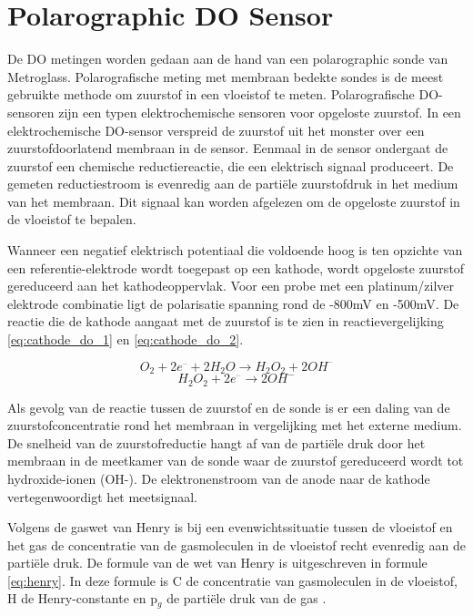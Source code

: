 \section{Polarographic DO Sensor}
De DO metingen worden gedaan aan de hand van een polarographic sonde van Metroglass. Polarografische meting met membraan bedekte sondes is de meest gebruikte methode om zuurstof in een vloeistof te meten. Polarografische DO-sensoren zijn een typen elektrochemische sensoren voor opgeloste zuurstof. In een elektrochemische DO-sensor verspreid de zuurstof uit het monster over een zuurstofdoorlatend membraan in de sensor. Eenmaal in de sensor ondergaat de zuurstof een chemische reductiereactie, die een elektrisch signaal produceert. De gemeten reductiestroom is evenredig aan de partiële zuurstofdruk in het medium van het membraan. Dit signaal kan worden afgelezen om de opgeloste zuurstof in de vloeistof te bepalen.

Wanneer een negatief elektrisch potentiaal die voldoende hoog is ten opzichte van een referentie-elektrode wordt toegepast op een kathode, wordt opgeloste zuurstof gereduceerd aan het kathodeoppervlak\cite{hamilton_do}. Voor een probe met een platinum/zilver elektrode combinatie ligt de polarisatie spanning rond de -800mV en -500mV. De reactie die de kathode aangaat met de zuurstof is te zien in reactievergelijking \ref{eq:cathode_do_1} en \ref{eq:cathode_do_2}\cite{linek_covered_probes}.

\begin{equation}\label{eq:cathode_do_1}
	O_{2} + 2e^{–} + 2H_{2}O \rightarrow H_{2}O_{2} + 2OH^{–}
\end{equation}
\begin{equation}\label{eq:cathode_do_2}
	H_{2}O_{2} + 2e^{–} \rightarrow  2OH^{-}
\end{equation}

Als gevolg van de reactie tussen de zuurstof en de sonde is er een daling van de zuurstofconcentratie rond het membraan in vergelijking met het externe medium. De snelheid van de zuurstofreductie hangt af van de partiële druk door het membraan in de meetkamer van de sonde waar de zuurstof gereduceerd wordt tot
hydroxide-ionen (OH-)\cite{mt_do_measurement}. De elektronenstroom van de anode naar de kathode vertegenwoordigt het meetsignaal.

Volgens de gaswet van Henry is bij een evenwichtssituatie tussen de vloeistof en het gas de concentratie van de gasmoleculen in de vloeistof recht evenredig aan de partiële druk. De formule van de wet van Henry is uitgeschreven in formule \ref{eq:henry}. In deze formule is C de concentratie van gasmoleculen in de vloeistof, H de Henry-constante en p$_g$ de partiële druk van de gas \cite{henry}.

